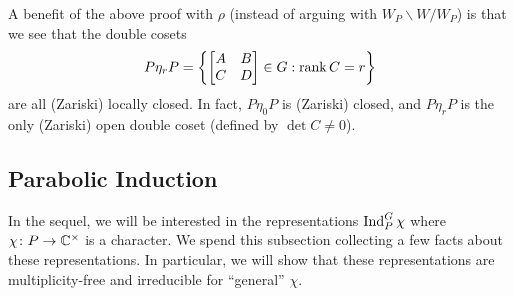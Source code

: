 \begin{remark}
    A benefit of the above proof with $\rho$ (instead of arguing with $W_P\backslash W/W_P$) is that we see that the double cosets
    \[P\eta_rP=\left\{\begin{bmatrix}
        A & B \\ C & D
    \end{bmatrix}\in G:\operatorname{rank}C=r\right\}\]
    are all (Zariski) locally closed. In fact, $P\eta_0P$ is (Zariski) closed, and $P\eta_rP$ is the only (Zariski) open double coset (defined by $\det C\ne0$).
\end{remark}


\subsection{Parabolic Induction}
In the sequel, we will be interested in the representations $\operatorname{Ind}_P^G\chi$ where $\chi\colon P\to\mathbb C^\times$ is a character. We spend this subsection collecting a few facts about these representations. In particular, we will show that these representations are multiplicity-free and irreducible for ``general'' $\chi$.

